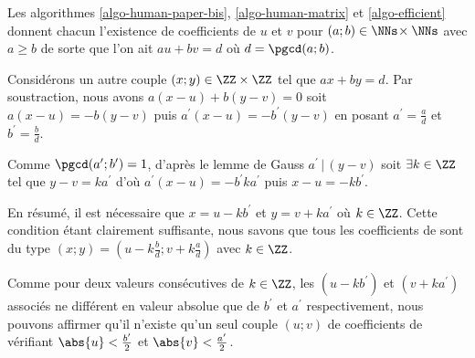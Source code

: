 Les algorithmes \ref{algo-human-paper-bis}, \ref{algo-human-matrix} et \ref{algo-efficient} donnent chacun l'existence de coefficients de \bb{} $u$ et $v$ pour $(a ; b) \in \NNs \!\times \NNs$ avec $a \geq b$ de sorte que l'on ait $a u + b v = d$ où $d = \pgcd(a ; b)$.


\medskip


Considérons un autre couple $(x ; y) \in \ZZ \times \ZZ$ tel que $a x + b y = d$. Par soustraction, nous avons $a(x - u) + b(y - v) = 0$ soit $a(x - u) = - b(y - v)$ puis $a^\prime(x - u) = - b^\prime(y - v)$ en posant $a^\prime = \frac{a}{d}$ et  $b^\prime = \frac{b}{d}$.


\medskip


Comme $\pgcd(a^\prime ; b^\prime) = 1$, d'après le lemme de Gauss $a^\prime \,|\, (y - v)$ soit $\exists k \in \ZZ$ tel que $y - v = k a^\prime$ d'où $a^\prime(x - u) = - b^\prime k a^\prime$ puis $x - u = - k b^\prime$. 


\medskip


En résumé, il est nécessaire que $x = u - k b^\prime$ et $y = v + k a^\prime$ où $k \in \ZZ$. Cette condition étant clairement suffisante, nous savons que tous les coefficients de \bb{} sont du type $(x ; y) = (u - k \frac{b}{d} ; v + k \frac{a}{d})$ avec $k \in \ZZ$.


\begin{remark}
	Comme pour deux valeurs consécutives de $k \in \ZZ$, les $(u - k b^\prime)$ et $(v + k a^\prime)$ associés ne différent en valeur absolue que de $b^\prime$ et $a^\prime$ respectivement, nous pouvons affirmer qu'il n'existe qu'un seul couple $(u ; v)$ de coefficients de \bb{} vérifiant $\abs{u} < \frac{b^\prime}{2}$ et $\abs{v} < \frac{a^\prime}{2}$.
\end{remark}
